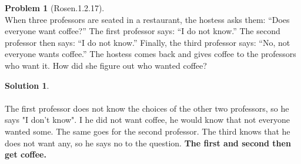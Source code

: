 \documentclass{article}
\theoremstyle{definition}
\newtheorem*{problem}{Problem}
\newtheorem*{solution}{Solution}
\begin{document}
\begin{problem}[Rosen.1.2.17]\ \\
When three professors are seated in a restaurant, the hostess
asks them: “Does everyone want coffee?” The first
professor says: “I do not know.” The second professor
then says: “I do not know.” Finally, the third professor
says: “No, not everyone wants coffee.” The hostess comes
back and gives coffee to the professors who want it. How
did she figure out who wanted coffee?
\begin{compactenum}
\renewcommand{\theenumi}{\alph{enumi}}

\end{compactenum}
\end{problem}

\begin{solution}\ \\
\ \\
The first professor does not know the choices of the other two professors, so he says 
"I don't know". I he did not want coffee, he would know that not everyone wanted some. The same goes for the second professor. The third knows that he does not want any, so he says no to the question. \textbf{The first and second then get coffee.}
\begin{compactenum}
\renewcommand{\theenumi}{\alph{enumi}}


\end{compactenum}
\end{solution}
\end{document}
